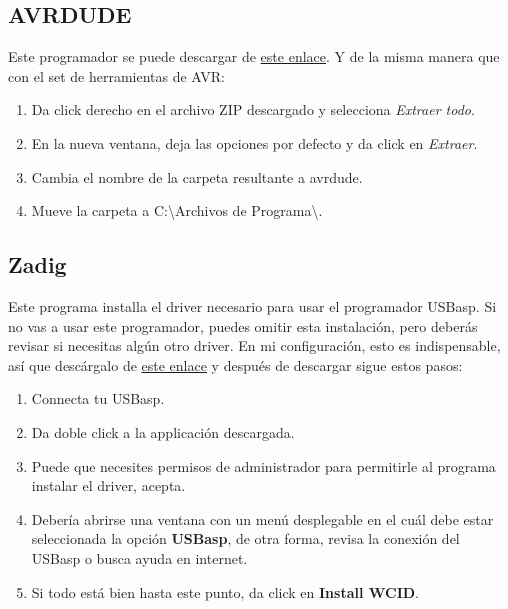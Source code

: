 \documentclass[10pt,letterpaper]{article}
\begin{document}
\subsection{AVRDUDE}
Este programador se puede descargar de \href{https://github.com/avrdudes/avrdude/releases}{este enlace}. Y de la misma manera que con el set de herramientas de AVR:
\begin{enumerate}
    \item Da click derecho en el archivo ZIP descargado y selecciona \textit{Extraer todo}.
    \item En la nueva ventana, deja las opciones por defecto y da click en \textit{Extraer}.
    \item Cambia el nombre de la carpeta resultante a {\color{ForestGreen}avrdude}. 
    \item Mueve la carpeta a {\color{ForestGreen}C:\textbackslash Archivos de Programa\textbackslash}.
\end{enumerate}

\subsection{Zadig}
Este programa installa el driver necesario para usar el programador USBasp. Si no vas a usar este programador, puedes omitir esta instalación, pero deberás revisar si necesitas algún otro driver. En mi configuración, esto es indispensable, así que descárgalo de \href{https://zadig.akeo.ie/}{este enlace} y después de descargar sigue estos pasos:
\begin{enumerate}
    \item Connecta tu USBasp.
    \item Da doble click a la applicación descargada.
    \item Puede que necesites permisos de administrador para permitirle al programa instalar el driver, acepta.
    \item Debería abrirse una ventana con un menú desplegable en el cuál debe estar seleccionada la opción \textbf{USBasp}, de otra forma, revisa la conexión del USBasp o busca ayuda en internet.
    \item Si todo está bien hasta este punto, da click en \textbf{Install WCID}.
\end{enumerate}
\end{document}
